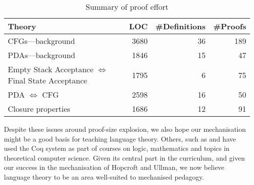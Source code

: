 \begin{table}
\begin{center}
\begin{tabular}{lrrr}
  \textbf{Theory}&\textbf{LOC}&\textbf{\#Definitions}&\textbf{\#Proofs}\\
  \hline
  CFGs---background       & 3680 & 36 & 189 \\
  PDAs---background        & 1846 & 15 & 47 \\
  Empty Stack Acceptance $\iff$ Final State Acceptance & 1795 & 6 & 75 \\
  PDA $\iff$ CFG & 2598 & 16 & 50\\
  Closure properties & 1686 & 12 & 91\\
\end{tabular}
\end{center}
\caption{Summary of proof effort}
\label{tab:numbers}
\end{table}

Despite these issues around proof-size explosion, we also hope our mechanisation might be a good basis for teaching language theory.
Others, such as \citet{pate07} and \citet{Pierce:LambdaTA-ITP} have used the Coq system as part of courses on logic, mathematics and topics in theoretical computer science.
Given its central part in the curriculum, and given our success in the mechanisation of Hopcroft and Ullman, we now believe language theory to be an area well-suited to mechanised pedagogy.



